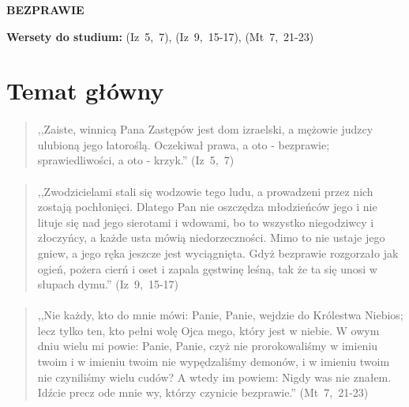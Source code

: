 \documentclass[10pt,a4paper,oneside]{article}
\begin{document}
\centerline{\textbf{\MakeUppercase{Bezprawie}}}
\begin{center}
\textbf{Wersety do studium:} \mbox{(Iz 5, 7)}, \mbox{(Iz 9, 15-17)}, \mbox{(Mt 7, 21-23)}
\end{center}
\section{Temat główny}
\paragraph{}
\begin{quote}
,,Zaiste, winnicą Pana Zastępów jest dom izraelski, a mężowie judzcy ulubioną jego latoroślą. Oczekiwał prawa, a oto - bezprawie; sprawiedliwości, a oto - krzyk.'' \mbox{(Iz 5, 7)}
\end{quote}
\paragraph{}
\begin{quote}
,,Zwodzicielami stali się wodzowie tego ludu, a prowadzeni przez nich zostają pochłonięci. Dlatego Pan nie oszczędza młodzieńców jego i nie lituje się nad jego sierotami i wdowami, bo to wszystko niegodziwcy i złoczyńcy, a każde usta mówią niedorzeczności. Mimo to nie ustaje jego gniew, a jego ręka jeszcze jest wyciągnięta. Gdyż bezprawie rozgorzało jak ogień, pożera cierń i oset i zapala gęstwinę leśną, tak że ta się unosi w słupach dymu.'' \mbox{(Iz 9, 15-17)}
\end{quote}
\paragraph{}
\begin{quote}
,,Nie każdy, kto do mnie mówi: Panie, Panie, wejdzie do Królestwa Niebios; lecz tylko ten, kto pełni wolę Ojca mego, który jest w niebie. W owym dniu wielu mi powie: Panie, Panie, czyż nie prorokowaliśmy w imieniu twoim i w imieniu twoim nie wypędzaliśmy demonów, i w imieniu twoim nie czyniliśmy wielu cudów? A wtedy im powiem: Nigdy was nie znałem. Idźcie precz ode mnie wy, którzy czynicie bezprawie.'' \mbox{(Mt 7, 21-23)}
\end{quote}
\end{document}
